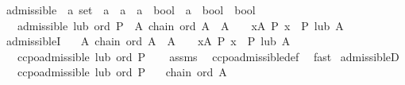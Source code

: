 \begin{isabellebody}
\endisatagML
{\isafoldML}%
%
\isadelimML
%
\endisadelimML
\isanewline
\isanewline
{}\isamarkupfalse%
\ admissible\ {\isacharcolon}{\kern0pt}{\isacharcolon}{\kern0pt}\ {\isachardoublequoteopen}{\isacharparenleft}{\kern0pt}{\isacharprime}{\kern0pt}a\ set\ {\isasymRightarrow}\ {\isacharprime}{\kern0pt}a{\isacharparenright}{\kern0pt}\ {\isasymRightarrow}\ {\isacharparenleft}{\kern0pt}{\isacharprime}{\kern0pt}a\ {\isasymRightarrow}\ {\isacharprime}{\kern0pt}a\ {\isasymRightarrow}\ bool{\isacharparenright}{\kern0pt}\ {\isasymRightarrow}\ {\isacharparenleft}{\kern0pt}{\isacharprime}{\kern0pt}a\ {\isasymRightarrow}\ bool{\isacharparenright}{\kern0pt}\ {\isasymRightarrow}\ bool{\isachardoublequoteclose}\isanewline
\ \ \ {\isachardoublequoteopen}admissible\ lub\ ord\ P\ {\isasymlongleftrightarrow}\ {\isacharparenleft}{\kern0pt}{\isasymforall}A{\isachardot}{\kern0pt}\ chain\ ord\ A\ {\isasymlongrightarrow}\ A\ {\isasymnoteq}\ {\isacharbraceleft}{\kern0pt}{\isacharbraceright}{\kern0pt}\ {\isasymlongrightarrow}\ {\isacharparenleft}{\kern0pt}{\isasymforall}x{\isasymin}A{\isachardot}{\kern0pt}\ P\ x{\isacharparenright}{\kern0pt}\ {\isasymlongrightarrow}\ P\ {\isacharparenleft}{\kern0pt}lub\ A{\isacharparenright}{\kern0pt}{\isacharparenright}{\kern0pt}{\isachardoublequoteclose}\isanewline
\isanewline
{}\isamarkupfalse%
\ admissibleI{\isacharcolon}{\kern0pt}\isanewline
\ \ \ {\isachardoublequoteopen}{\isasymAnd}A{\isachardot}{\kern0pt}\ chain\ ord\ A\ {\isasymLongrightarrow}\ A\ {\isasymnoteq}\ {\isacharbraceleft}{\kern0pt}{\isacharbraceright}{\kern0pt}\ {\isasymLongrightarrow}\ {\isasymforall}x{\isasymin}A{\isachardot}{\kern0pt}\ P\ x\ {\isasymLongrightarrow}\ P\ {\isacharparenleft}{\kern0pt}lub\ A{\isacharparenright}{\kern0pt}{\isachardoublequoteclose}\isanewline
\ \ \ {\isachardoublequoteopen}ccpo{\isachardot}{\kern0pt}admissible\ lub\ ord\ P{\isachardoublequoteclose}\isanewline
%
\isadelimproof
\ \ %
\endisadelimproof
%
\isatagproof
{}\isamarkupfalse%
\ assms\ \isamarkupfalse%
\ ccpo{\isachardot}{\kern0pt}admissible{\isacharunderscore}{\kern0pt}def\ \isamarkupfalse%
\ fast%
\endisatagproof
{\isafoldproof}%
%
\isadelimproof
\isanewline
%
\endisadelimproof
\isanewline
{}\isamarkupfalse%
\ admissibleD{\isacharcolon}{\kern0pt}\isanewline
\ \ \ {\isachardoublequoteopen}ccpo{\isachardot}{\kern0pt}admissible\ lub\ ord\ P{\isachardoublequoteclose}\isanewline
\ \ \ {\isachardoublequoteopen}chain\ ord\ A{\isachardoublequoteclose}\isanewline

\end{isabellebody}
